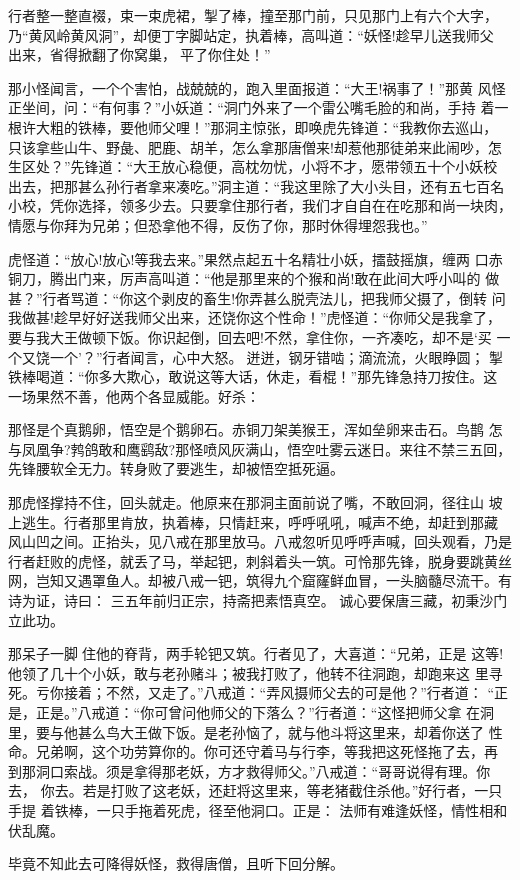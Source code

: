 行者整一整直裰，束一束虎裙，掣了棒，撞至那门前，只见那门上有六个大字，
乃“黄风岭黄风洞”，却便丁字脚站定，执着棒，高叫道：“妖怪!趁早儿送我师父
出来，省得掀翻了你窝巢，平了你住处！”

那小怪闻言，一个个害怕，战兢兢的，跑入里面报道：“大王!祸事了！”那黄
风怪正坐间，问：“有何事？”小妖道：“洞门外来了一个雷公嘴毛脸的和尚，手持
着一根许大粗的铁棒，要他师父哩！”那洞主惊张，即唤虎先锋道：“我教你去巡山，
只该拿些山牛、野彘、肥鹿、胡羊，怎么拿那唐僧来!却惹他那徒弟来此闹吵，怎
生区处？”先锋道：“大王放心稳便，高枕勿忧，小将不才，愿带领五十个小妖校
出去，把那甚么孙行者拿来凑吃。”洞主道：“我这里除了大小头目，还有五七百名
小校，凭你选择，领多少去。只要拿住那行者，我们才自自在在吃那和尚一块肉，
情愿与你拜为兄弟；但恐拿他不得，反伤了你，那时休得埋怨我也。”

虎怪道：“放心!放心!等我去来。”果然点起五十名精壮小妖，擂鼓摇旗，缠两
口赤铜刀，腾出门来，厉声高叫道：“他是那里来的个猴和尚!敢在此间大呼小叫的
做甚？”行者骂道：“你这个剥皮的畜生!你弄甚么脱壳法儿，把我师父摄了，倒转
问我做甚!趁早好好送我师父出来，还饶你这个性命！”虎怪道：“你师父是我拿了，
要与我大王做顿下饭。你识起倒，回去吧!不然，拿住你，一齐凑吃，却不是‘买
一个又饶一个’？”行者闻言，心中大怒。迸迸，钢牙错啮；滴流流，火眼睁圆；
掣铁棒喝道：“你多大欺心，敢说这等大话，休走，看棍！”那先锋急持刀按住。这
一场果然不善，他两个各显威能。好杀：

那怪是个真鹅卵，悟空是个鹅卵石。赤铜刀架美猴王，浑如垒卵来击石。鸟鹊
怎与凤凰争?鹁鸽敢和鹰鹞敌?那怪喷风灰满山，悟空吐雾云迷日。来往不禁三五回，
先锋腰软全无力。转身败了要逃生，却被悟空抵死逼。

那虎怪撑持不住，回头就走。他原来在那洞主面前说了嘴，不敢回洞，径往山
坡上逃生。行者那里肯放，执着棒，只情赶来，呼呼吼吼，喊声不绝，却赶到那藏
风山凹之间。正抬头，见八戒在那里放马。八戒忽听见呼呼声喊，回头观看，乃是
行者赶败的虎怪，就丢了马，举起钯，刺斜着头一筑。可怜那先锋，脱身要跳黄丝
网，岂知又遇罩鱼人。却被八戒一钯，筑得九个窟窿鲜血冒，一头脑髓尽流干。有
诗为证，诗曰：
三五年前归正宗，持斋把素悟真空。
诚心要保唐三藏，初秉沙门立此功。

那呆子一脚住他的脊背，两手轮钯又筑。行者见了，大喜道：“兄弟，正是
这等!他领了几十个小妖，敢与老孙赌斗；被我打败了，他转不往洞跑，却跑来这
里寻死。亏你接着；不然，又走了。”八戒道：“弄风摄师父去的可是他？”行者道：
“正是，正是。”八戒道：“你可曾问他师父的下落么？”行者道：“这怪把师父拿
在洞里，要与他甚么鸟大王做下饭。是老孙恼了，就与他斗将这里来，却着你送了
性命。兄弟啊，这个功劳算你的。你可还守着马与行李，等我把这死怪拖了去，再
到那洞口索战。须是拿得那老妖，方才救得师父。”八戒道：“哥哥说得有理。你去，
你去。若是打败了这老妖，还赶将这里来，等老猪截住杀他。”好行者，一只手提
着铁棒，一只手拖着死虎，径至他洞口。正是：
法师有难逢妖怪，情性相和伏乱魔。

毕竟不知此去可降得妖怪，救得唐僧，且听下回分解。